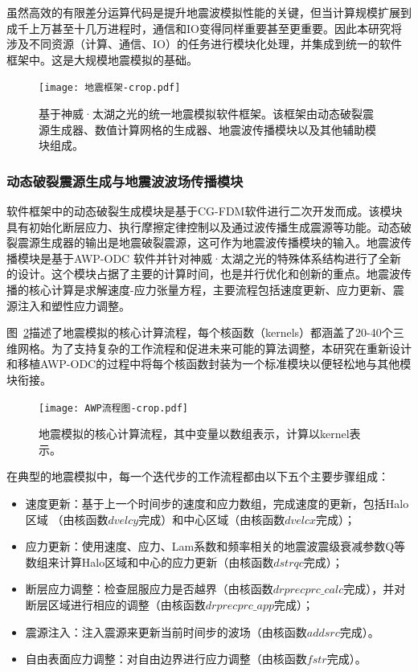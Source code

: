 虽然高效的有限差分运算代码是提升地震波模拟性能的关键，但当计算规模扩展到成千上万甚至十几万进程时，通信和IO变得同样重要甚至更重要。因此本研究将涉及不同资源（计算、通信、IO）的任务进行模块化处理，并集成到统一的软件框架中。这是大规模地震模拟的基础。

\begin{figure}[ht]
\centering
\texttt{[image: 地震框架-crop.pdf]}
\caption{基于神威·太湖之光的统一地震模拟软件框架。该框架由动态破裂震源生成器、数值计算网格的生成器、地震波传播模块以及其他辅助模块组成。}
\label{fig:framework}
\end{figure}

\subsubsection{动态破裂震源生成与地震波波场传播模块}

软件框架中的动态破裂生成模块是基于CG-FDM软件\citep{zhang2014three}进行二次开发而成。该模块具有初始化断层应力、执行摩擦定律控制以及通过波传播生成震源等功能。动态破裂震源生成器的输出是地震破裂震源，这可作为地震波传播模块的输入。地震波传播模块是基于AWP-ODC \citep {cui2010scalable}软件并针对神威·太湖之光的特殊体系结构进行了全新的设计。这个模块占据了主要的计算时间，也是并行优化和创新的重点。地震波传播的核心计算是求解速度-应力张量方程，主要流程包括速度更新、应力更新、震源注入和塑性应力调整。

图~\ref{fig:awp-workflow}描述了地震模拟的核心计算流程，每个核函数（kernels）都涵盖了20-40个三维网格。为了支持复杂的工作流程和促进未来可能的算法调整，本研究在重新设计和移植AWP-ODC的过程中将每个核函数封装为一个标准模块以便轻松地与其他模块衔接。

\begin{figure}[ht]
\centering
\texttt{[image: AWP流程图-crop.pdf]}
\caption{地震模拟的核心计算流程，其中变量以数组表示，计算以kernel表示。}
\label{fig:awp-workflow}
\end{figure}

在典型的地震模拟中，每一个迭代步的工作流程都由以下五个主要步骤组成：

\begin{itemize}
\item 速度更新：基于上一个时间步的速度和应力数组，完成速度的更新，包括Halo区域 （由核函数$dvelcy$完成）和中心区域（由核函数$dvelcx$完成）；

\item 应力更新：使用速度、应力、Lam系数和频率相关的地震波震级衰减参数Q等数组来计算Halo区域和中心的应力更新（由核函数$dstrqc$完成）；

\item 断层应力调整：检查屈服应力是否越界（由核函数$drprecprc\_calc$完成），并对断层区域进行相应的调整（由核函数$drprecprc\_app$完成）；

\item 震源注入：注入震源来更新当前时间步的波场（由核函数$addsrc$完成）。

\item 自由表面应力调整：对自由边界进行应力调整（由核函数$fstr$完成）。
\end{itemize}

